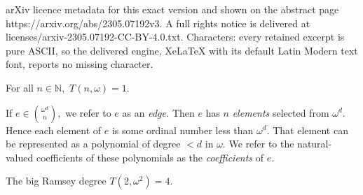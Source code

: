 \documentclass[10pt,a4paper]{amsart}
\newcommand{\COL}{\operatorname{COL}}
\newcommand{\N}{\mathbb{N}}
\newcommand{\numcolors}{c}
\newcommand{\numpoints}{n}
\newcommand{\oequiv}{\approx}
\newcommand{\om}{\omega}
\begin{document}
arXiv licence metadata for this exact version and shown on the abstract page https://arxiv.org/abs/2305.07192v3. A full rights notice is delivered at licenses/arxiv-2305.07192-CC-BY-4.0.txt. Characters: every retained excerpt is pure ASCII, so the delivered engine, XeLaTeX with its default Latin Modern text font, reports no missing character.
\begin{theorem}\label{th:ramsey}
For all $\numpoints \in \N,$
$T(\numpoints,\omega)=1.$
\end{theorem}

\begin{definition} \label{def:coef}
If $e \in \binom{\om^d}{n},$ we refer to $e$ as an {\it edge.} Then $e$ has $n$ {\it elements} selected from $\om^d.$
Hence each element of $e$ is some ordinal number less than $\om^d.$ That element can be represented as a polynomial of degree $< d$ in $\omega.$ We refer to the natural-valued coefficients of these polynomials as the {\it coefficients} of $e.$
\end{definition}

\begin{theorem}\label{th:om2} 
The big Ramsey degree $T(2,\om^2)=4$.
\end{theorem} 
\end{document}
